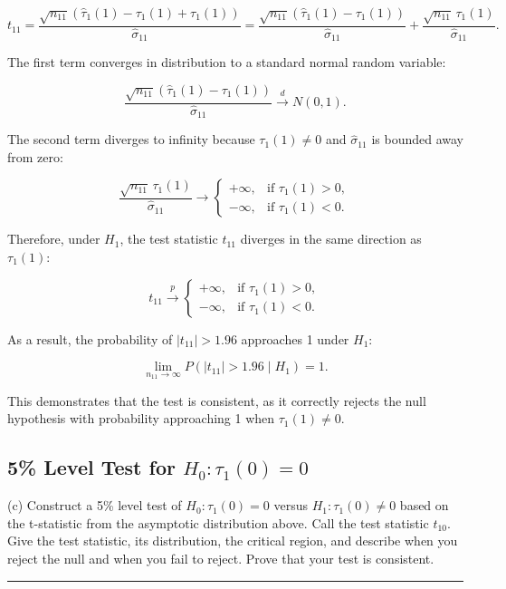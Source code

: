\documentclass{article}
\newenvironment{colorparagraph}[1]{\par\color{#1}}{\par}
\begin{document}
\[
t_{11} = \frac{\sqrt{n_{11}} \left( \hat{\tau}_1(1) - \tau_1(1) + \tau_1(1) \right)}{\hat{\sigma}_{11}} = \frac{\sqrt{n_{11}} \left( \hat{\tau}_1(1) - \tau_1(1) \right)}{\hat{\sigma}_{11}} + \frac{\sqrt{n_{11}} \, \tau_1(1)}{\hat{\sigma}_{11}}.
\]

The first term converges in distribution to a standard normal random variable:

\[
\frac{\sqrt{n_{11}} \left( \hat{\tau}_1(1) - \tau_1(1) \right)}{\hat{\sigma}_{11}} \xrightarrow{d} N(0,1).
\]

The second term diverges to infinity because \( \tau_1(1) \neq 0 \) and \( \hat{\sigma}_{11} \) is bounded away from zero:

\[
\frac{\sqrt{n_{11}} \, \tau_1(1)}{\hat{\sigma}_{11}} \to 
\begin{cases}
+\infty, & \text{if } \tau_1(1) > 0, \\
-\infty, & \text{if } \tau_1(1) < 0.
\end{cases}
\]

Therefore, under \( H_1 \), the test statistic \( t_{11} \) diverges in the same direction as \( \tau_1(1) \):

\[
t_{11} \xrightarrow{p} 
\begin{cases}
+\infty, & \text{if } \tau_1(1) > 0, \\
-\infty, & \text{if } \tau_1(1) < 0.
\end{cases}
\]

As a result, the probability of \( |t_{11}| > 1.96 \) approaches 1 under \( H_1 \):

\[
\lim_{n_{11} \to \infty} P\left( |t_{11}| > 1.96 \mid H_1 \right) = 1.
\]

This demonstrates that the test is consistent, as it correctly rejects the null hypothesis with probability approaching 1 when \( \tau_1(1) \neq 0 \).

\begin{colorparagraph}{questioncolor}
\label{q1c}\subsection{5\% Level Test for \( H_0: \tau_1(0) = 0 \)}
(c) Construct a 5\% level test of \( H_0 : \tau_1(0) = 0 \) versus \( H_1 : \tau_1(0) \neq 0 \) based on the t-statistic from the asymptotic distribution above. Call the test statistic \( t_{10} \). Give the test statistic, its distribution, the critical region, and describe when you reject the null and when you fail to reject. Prove that your test is consistent.

\rule{\textwidth}{0.5pt}
\end{colorparagraph}
\end{document}
